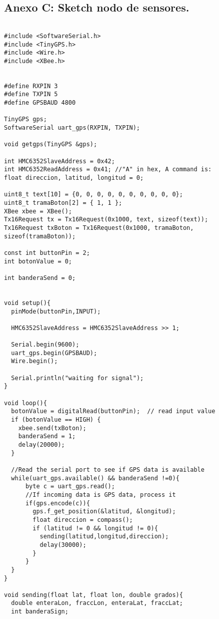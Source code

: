 \subsection*{Anexo C: Sketch nodo de sensores.}
\label{anexo-c}

\hbox{}

\begin{verbatim}

#include <SoftwareSerial.h>
#include <TinyGPS.h>
#include <Wire.h>
#include <XBee.h>


#define RXPIN 3
#define TXPIN 5
#define GPSBAUD 4800

TinyGPS gps;
SoftwareSerial uart_gps(RXPIN, TXPIN);

void getgps(TinyGPS &gps);

int HMC6352SlaveAddress = 0x42; 
int HMC6352ReadAddress = 0x41; //"A" in hex, A command is: 
float direccion, latitud, longitud = 0;

uint8_t text[10] = {0, 0, 0, 0, 0, 0, 0, 0, 0, 0};
uint8_t tramaBoton[2] = { 1, 1 };
XBee xbee = XBee();
Tx16Request tx = Tx16Request(0x1000, text, sizeof(text));
Tx16Request txBoton = Tx16Request(0x1000, tramaBoton, sizeof(tramaBoton));

const int buttonPin = 2;
int botonValue = 0;

int banderaSend = 0;


void setup(){
  pinMode(buttonPin,INPUT);

  HMC6352SlaveAddress = HMC6352SlaveAddress >> 1;

  Serial.begin(9600);
  uart_gps.begin(GPSBAUD);
  Wire.begin();
  
  Serial.println("waiting for signal");
}

void loop(){
  botonValue = digitalRead(buttonPin);  // read input value
  if (botonValue == HIGH) {         
    xbee.send(txBoton); 
    banderaSend = 1;
    delay(20000);
  }

  //Read the serial port to see if GPS data is available
  while(uart_gps.available() && banderaSend !=0){
      byte c = uart_gps.read();
      //If incoming data is GPS data, process it
      if(gps.encode(c)){
        gps.f_get_position(&latitud, &longitud);
        float direccion = compass();
        if (latitud != 0 && longitud != 0){
          sending(latitud,longitud,direccion);
          delay(30000);
        }
      }
  }
}

void sending(float lat, float lon, double grados){
  double enteraLon, fraccLon, enteraLat, fraccLat;
  int banderaSign;


\end{verbatim}
